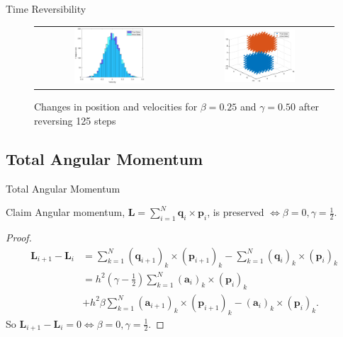 \documentclass{beamer}
\renewcommand{\vec}[1]{\mathbf{#1}}
\begin{document}
\begin{frame}{Time Reversibility}
 {
	\begin{figure}
		\centering
 		\begin{tabular}{@{}cc@{}}
    			\includegraphics[width=0.5\textwidth]{time_reversible_b0,25g0,50_250_velocity_histogram.eps} &
    			\includegraphics[width=0.5\textwidth]{time_reversible_b0,25g0,50_250_position_overlay.eps} \\
		\end{tabular}
  		\caption{Changes in position and velocities for $\beta = 0.25$ and $\gamma = 0.50$ after reversing 125 steps}
		\label{fig:time_reversible_b0.25g0.50_250}
	\end{figure}
}
\end{frame}

\subsection{Total Angular Momentum}

\begin{frame}{Total Angular Momentum}
\begin{block}{Claim} Angular momentum, $\vec{L} = \sum_{i=1}^{N} \vec{q}_{i} \times \vec{p}_{i}$,  is preserved $\Leftrightarrow \beta = 0, \gamma = \frac{1}{2}$. \end{block}
	\setlength{\belowdisplayskip}{1pt}
\begin{proof}
	\begin{align*}
		\vec{L}_{i+1} - \vec{ L}_{i} &= \sum_{k=1}^{N}\left(\vec{q}_{i+1}\right)_{k} \times \left(\vec{p}_{i+1}\right)_{k} - \sum_{k=1}^{N}\left(\vec{q}_{i}\right)_{k} \times \left(\vec{p}_{i}\right)_{k} \\
		&= h^{2}\left(\gamma - \frac{1}{2}\right)\sum_{k=1}^{N} (\vec{a}_{i})_{k} \times (\vec{p}_{i})_{k} \\ &+ h^{2}\beta\sum_{k=1}^{N} (\vec{a}_{i+1})_{k} \times (\vec{p}_{i+1})_{k} - (\vec{a}_{i})_{k} \times (\vec{p}_{i})_{k} .
	\end{align*}
	So $\vec{L}_{i+1}-\vec{L}_{i} = 0 \Leftrightarrow \beta = 0, \gamma = \frac{1}{2}$.
\end{proof}
\end{frame}
\end{document}

